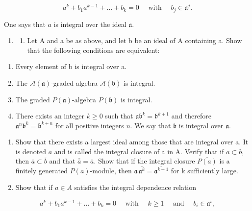 \[
a ^ {k} + b _ {1} a ^ {k - 1} + \dots + b _ {k} = 0 \quad \text { with } \quad b _ {j} \in \mathfrak {a} ^ {j}.
\]

One says that \(a\) is integral over the ideal \(\mathfrak{a}\).

\begin{enumerate}
\def\labelenumi{\arabic{enumi})}
\setcounter{enumi}{8}
\tightlist
\item
  \begin{enumerate}
  \def\labelenumii{\alph{enumii})}
  \tightlist
  \item
    Let A and a be as above, and let b be an ideal of A containing a. Show that the following conditions are equivalent:
  \end{enumerate}
\end{enumerate}

\begin{enumerate}
\def\labelenumi{(\roman{enumi})}
\item
  Every element of b is integral over a.
\item
  The \(\mathcal{A}(\mathfrak{a})\)-graded algebra \(\mathcal{A}(\mathfrak{b})\) is integral.
\item
  The graded \(P(\mathfrak{a})\)-algebra \(P(\mathfrak{b})\) is integral.
\item
  There exists an integer \(k \geqslant 0\) such that \(\mathfrak{a}\mathfrak{b}^{k} = \mathfrak{b}^{k+1}\) and therefore \(\mathfrak{a}^{n}\mathfrak{b}^{k} = \mathfrak{b}^{k+n}\) for all positive integers \(n\). We say that \(\mathfrak{b}\) is integral over \(\mathfrak{a}\).
\end{enumerate}

\begin{enumerate}
\def\labelenumi{\alph{enumi})}
\setcounter{enumi}{1}
\item
  Show that there exists a largest ideal among those that are integral over a. It is denoted \(\overline{a}\) and is called the integral closure of a in A. Verify that if \(a \subset b\), then \(\overline{a} \subset \overline{b}\) and that \(\overline{\overline{a}} = \overline{a}\). Show that if the integral closure \(\overline{P(a)}\) is a finitely generated \(P(a)\)-module, then \(\mathfrak{a}\,\overline{\mathfrak{a}^{k}} = \overline{\mathfrak{a}^{k+1}}\) for k sufficiently large.
\item
  Show that if \(a \in A\) satisfies the integral dependence relation
\end{enumerate}

\[
a ^ {k} + b _ {1} a ^ {k - 1} + \dots + b _ {k} = 0 \quad \text { with } \quad k \geqslant 1 \quad \text { and } \quad b _ {i} \in \mathfrak {a} ^ {i},
\]

